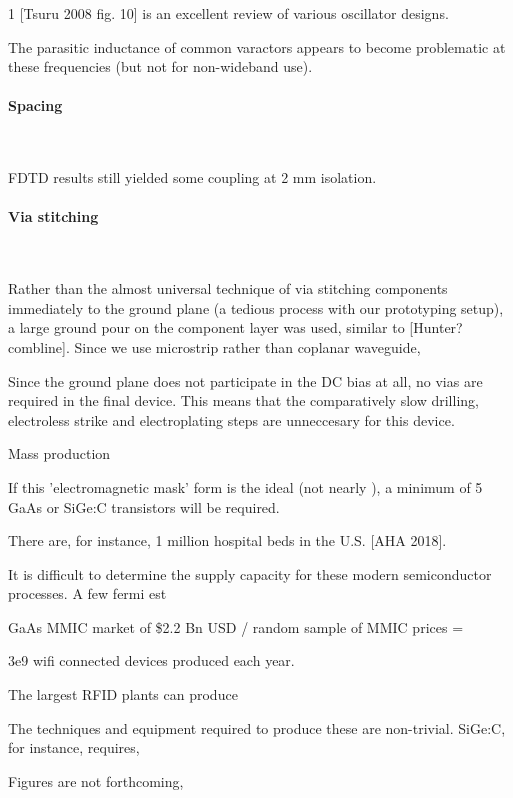 \documentclass[fleqn,10pt]{article}
\begin{document}
\begin{multicols}{1}
[Tsuru 2008 fig. 10] is an excellent review of various oscillator designs.

The parasitic inductance of common varactors appears to become problematic at these frequencies (but not for non-wideband use).

\paragraph{\textbf{Spacing}}\

FDTD results still yielded some coupling at 2 mm isolation.

\paragraph{\textbf{Via stitching}}\

Rather than the almost universal technique of via stitching components immediately to the ground plane (a tedious process with our prototyping setup), a large ground pour on the component layer was used, similar to [Hunter? combline]. Since we use microstrip rather than coplanar waveguide, 

Since the ground plane does not participate in the DC bias at all, no vias are required in the final device. This means that the comparatively slow drilling, electroless strike and electroplating steps are unneccesary for this device.




\clearpage
{\Large Mass production}


If this 'electromagnetic mask' form is the ideal (not nearly ), a minimum of 5 GaAs or SiGe:C transistors will be required.

There are, for instance, 1 million hospital beds in the U.S. [AHA 2018]. 

It is difficult to determine the supply capacity for these modern semiconductor processes. A few fermi est

GaAs MMIC market of \$2.2 Bn USD / random sample of MMIC prices = 

3e9 wifi connected devices produced each year.

The largest RFID plants can produce


The techniques and equipment required to produce these are non-trivial. SiGe:C, for instance, requires, 


Figures are not forthcoming, 


\end{multicols}
\end{document}
